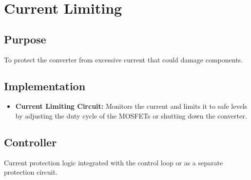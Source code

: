 \documentclass{article}
\begin{document}
\section{Current Limiting}
\label{sec:current_limiting}
\subsection{Purpose}
To protect the converter from excessive current that could damage components.

\subsection{Implementation}
\begin{itemize}
    \item \textbf{Current Limiting Circuit:} Monitors the current and limits it to safe levels by adjusting the duty cycle of the MOSFETs or shutting down the converter.
\end{itemize}

\subsection{Controller}
Current protection logic integrated with the control loop or as a separate protection circuit.
\end{document}
